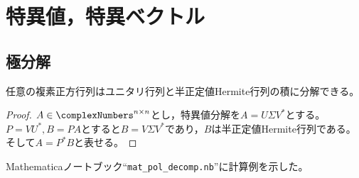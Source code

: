\chapter{特異値，特異ベクトル}
    \section{極分解}
        \begin{shadebox}
            任意の複素正方行列はユニタリ行列と半正定値Hermite行列の積に分解できる。
        \end{shadebox}
        \begin{proof}
            $A\in\complexNumbers^{n\times n}$とし，特異値分解を$A=U\Sigma V^*$とする。
            $P=VU^*,B=PA$とすると$B=V\Sigma V^*$であり，$B$は半正定値Hermite行列である。
            そして$A=P^*B$と表せる。
        \end{proof}
        Mathematicaノートブック``\nolinkurl{mat_pol_decomp.nb}''に計算例を示した。